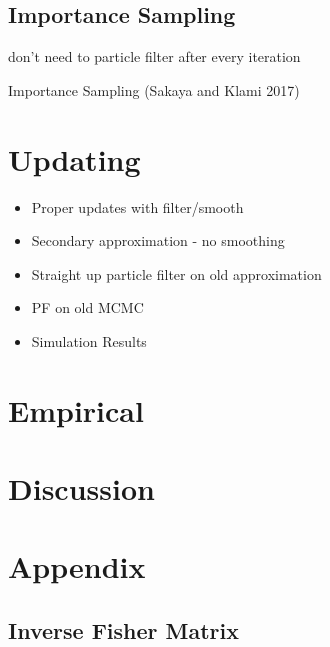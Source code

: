 \documentclass[12pt,a4paper]{article}%
\numberwithin{equation}{section}
\begin{document}
\subsection{Importance Sampling}

don't need to particle filter after every iteration

Importance Sampling (Sakaya and Klami 2017)


\section{Updating}

\begin{itemize}
\item Proper updates with filter/smooth
\item Secondary approximation - no smoothing
\item Straight up particle filter on old approximation
\item PF on old MCMC
\item Simulation Results
\end{itemize}

\section{Empirical}

\section{Discussion}




\section{Appendix}
\subsection{Inverse Fisher Matrix}

 
 
\end{document}
